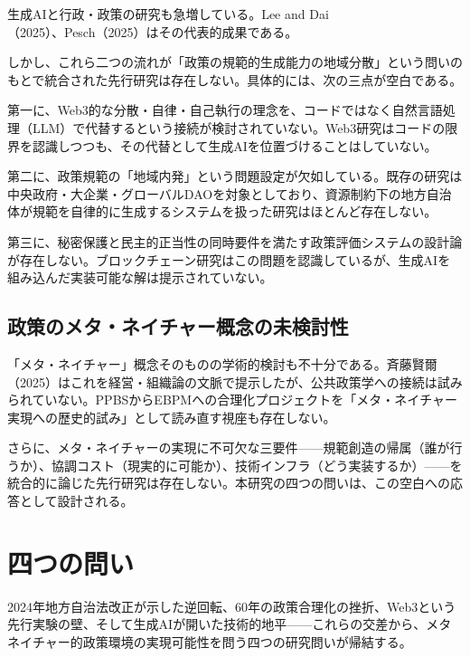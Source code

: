 生成AIと行政・政策の研究も急増している。Lee and Dai（2025）\cite{lee2025ai_policy_cycle}、Pesch（2025）\cite{pesch2025llm_admin}はその代表的成果である。

しかし、これら二つの流れが「政策の規範的生成能力の地域分散」という問いのもとで統合された先行研究は存在しない。具体的には、次の三点が空白である。

第一に、Web3的な分散・自律・自己執行の理念を、コードではなく自然言語処理（LLM）で代替するという接続が検討されていない。Web3研究はコードの限界を認識しつつも、その代替として生成AIを位置づけることはしていない。

第二に、政策規範の「地域内発」という問題設定が欠如している。既存の研究は中央政府・大企業・グローバルDAOを対象としており、資源制約下の地方自治体が規範を自律的に生成するシステムを扱った研究はほとんど存在しない。

第三に、秘密保護と民主的正当性の同時要件を満たす政策評価システムの設計論が存在しない。ブロックチェーン研究はこの問題を認識しているが\cite{reijers2018governance}、生成AIを組み込んだ実装可能な解は提示されていない。

\subsection{政策のメタ・ネイチャー概念の未検討性}
\label{subsec:intro_gap_metanature}

「メタ・ネイチャー」概念そのものの学術的検討も不十分である。斉藤賢爾（2025）はこれを経営・組織論の文脈で提示したが\cite{saito2025metanature}、公共政策学への接続は試みられていない。PPBSからEBPMへの合理化プロジェクトを「メタ・ネイチャー実現への歴史的試み」として読み直す視座も存在しない。

さらに、メタ・ネイチャーの実現に不可欠な三要件——規範創造の帰属（誰が行うか）、協調コスト（現実的に可能か）、技術インフラ（どう実装するか）——を統合的に論じた先行研究は存在しない。本研究の四つの問いは、この空白への応答として設計される。

\section{四つの問い}
\label{sec:intro_questions}

2024年地方自治法改正が示した逆回転、60年の政策合理化の挫折、Web3という先行実験の壁、そして生成AIが開いた技術的地平——これらの交差から、メタネイチャー的政策環境の実現可能性を問う四つの研究問いが帰結する。

